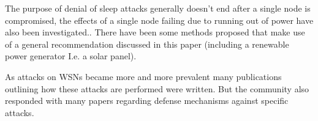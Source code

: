 The purpose of denial of sleep attacks generally doesn't end after a single node is compromised, the effects of a single node failing due to running out of power have also been investigated.\cite{Bradonjic_Hagberg_Feng_2011}. There have been some methods proposed that make use of a general recommendation discussed in this paper (including a renewable power generator I.e. a solar panel)\cite{Harvey_Kyker_2005}.

As attacks on WSNs became more and more prevalent many publications outlining how these attacks are performed were written\cite{1495974}\cite{4431860}. But the community also responded with many papers regarding defense mechanisms against specific attacks\cite{4455251}\cite{5283239}\cite{4267552}\cite{5949172}\cite{6425177}\cite{5541527}\cite{6164340}\cite{6104548}.


